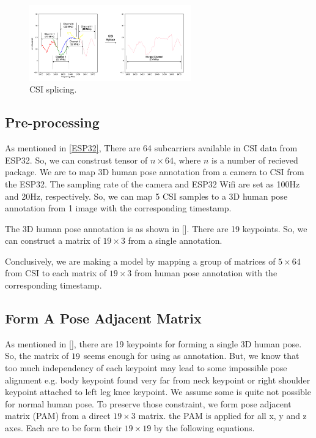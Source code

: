 \documentclass[conference]{IEEEtran}
\begin{document}
\begin{figure}[htbp]
	
	\centerline{\includegraphics[width=70mm,scale=0.5]{CSISplicing03.png}}
	\caption{CSI splicing.}
	\label{fig:CSISplicing02}
\end{figure}
	
	\subsection{Pre-processing}\label{Processing}
	
	As mentioned in \ref{ESP32}, There are 64 subcarriers available in CSI data from ESP32. So, we can construst tensor of $n\times64$, where $n$ is a number of recieved package. We are to map 3D human pose annotation from a camera to CSI from the ESP32. The sampling rate of the camera and ESP32 Wifi are set as 100Hz and 20Hz, respectively. So, we can map 5 CSI samples to a 3D human pose annotation from 1 image with the corresponding timestamp.
	
	The 3D human pose annotation is as shown in []. There are 19 keypoints. So, we can construct a matrix of $19 \times 3$ from a single annotation.
	
	Conclusively, we are making a model by mapping a group of matrices of $5\times64$ from CSI to each matrix of $19 \times 3$ from human pose annotation with the corresponding timestamp. 
	
	
	
	\subsection{Form A Pose Adjacent Matrix}
	
	As mentioned in [], there are 19 keypoints for forming a single 3D human pose. So, the matrix of $19\time3$ seems enough for using as annotation. But, we know that too much independency of each keypoint may lead to some impossible pose alignment e.g. body keypoint found very far from neck keypoint or right shoulder keypoint attached to left leg knee keypoint. We assume some is quite not possible for normal human pose. To preserve those constraint, we form pose adjacent matrix (PAM) from a direct $19\times3$ matrix. the PAM is applied for all x, y and z axes. Each are to be form their $19\times19$ by the following equations.
	
\end{document}
